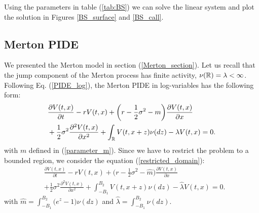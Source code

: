 Using the parameters in table (\ref{tab:BS}) we can solve the linear system and plot the solution in Figures \ref{BS_surface} and \ref{BS_call}.



\subsection{Merton PIDE}


We presented the Merton model in section (\ref{Merton_section}). 
Let us recall that the jump component of the Merton process has finite activity, $\nu(\mathbb{R}) = \lambda < \infty$.
Following Eq. (\ref{PIDE_log}), the Merton PIDE in log-variables has the following form: 
\begin{align}\label{Merton_PIDE}
&  \frac{\partial V(t,x)}{\partial t} - r V(t,x) 
          + \biggl( r -\frac{1}{2}\sigma^2 -m \biggr) \frac{\partial V(t,x)}{\partial x} \\ \nonumber
          &+ \frac{1}{2} \sigma^2 \frac{\partial^2 V(t,x)}{\partial x^2} 
          + \int_{\mathbb{R}} V(t,x+z) \nu(dz) - \lambda V(t,x)  = 0.
\end{align}
with $m$ defined in (\ref{parameter_m}).
Since we have to restrict the problem to a bounded region, we consider the equation (\ref{restricted_domain}):
\begin{align*}
&  \frac{\partial V(t,x)}{\partial t} - r V(t,x) 
          + \biggl( r -\frac{1}{2}\sigma^2 - \hat m \biggr) \frac{\partial V(t,x)}{\partial x} \\
          &+ \frac{1}{2} \sigma^2 \frac{\partial^2 V(t,x)}{\partial x^2} 
          + \int_{-B_1}^{B_2} V(t,x+z) \nu(dz) - \hat \lambda V(t,x)  = 0.
\end{align*}
with $\hat m = \int_{-B_1}^{B_2} \bigl( e^z-1 \bigr) \nu(dz)$ and $\hat \lambda = \int_{-B_1}^{B_2} \nu(dz)$.


